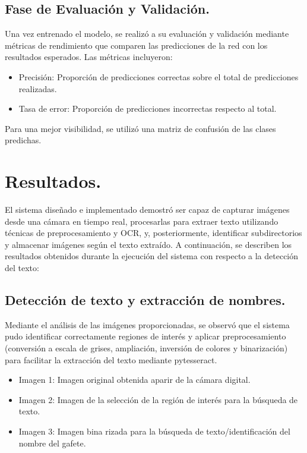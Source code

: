 \documentclass[12pt, letterpaper]{article}
\begin{document}
\subsection{Fase de Evaluación y Validación.}
Una vez entrenado el modelo, se realizó a su evaluación y validación mediante métricas de rendimiento que comparen las predicciones de la red con los resultados esperados. Las métricas incluyeron:
\begin{itemize}
    \item Precisión: Proporción de predicciones correctas sobre el total de predicciones realizadas.
    \item Tasa de error: Proporción de predicciones incorrectas respecto al total.
\end{itemize}
Para una mejor visibilidad, se utilizó una matriz de confusión de las clases predichas.

\section{Resultados.}
El sistema diseñado e implementado demostró ser capaz de capturar imágenes desde una cámara en tiempo real, procesarlas para extraer texto utilizando técnicas de preprocesamiento y OCR, y, posteriormente, identificar subdirectorios y almacenar imágenes según el texto extraído. A continuación, se describen los resultados obtenidos durante la ejecución del sistema con respecto a la detección del texto:

\subsection{Detección de texto y extracción de nombres.}
Mediante el análisis de las imágenes proporcionadas, se observó que el sistema pudo identificar correctamente regiones de interés y aplicar preprocesamiento (conversión a escala de grises, ampliación, inversión de colores y binarización) para facilitar la extracción del texto mediante pytesseract.

\begin{itemize}
    \item Imagen 1: Imagen original obtenida aparir de la cámara digital.
    \item Imagen 2: Imagen de la selección de la región de interés para la búsqueda de texto.
    \item Imagen 3: Imagen bina rizada para la búsqueda de texto/identificación del nombre del gafete. 
\end{itemize}
\end{document}
